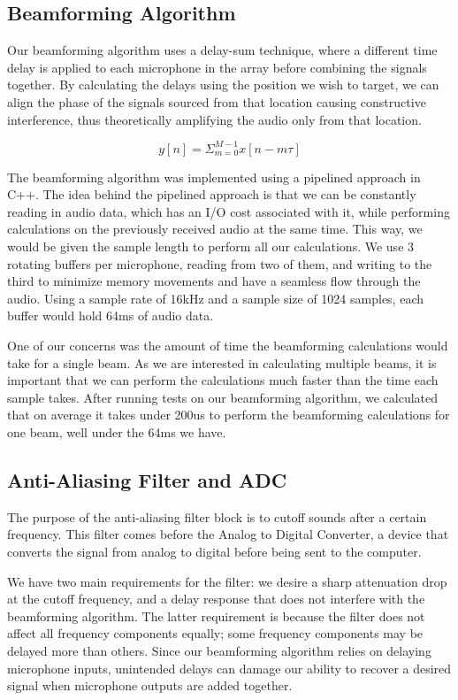 \documentclass[10pt,journal,compsoc]{IEEEtran}
\begin{document}
\subsection{Beamforming Algorithm}

Our beamforming algorithm uses a delay-sum technique, where a different time delay is applied to each microphone in the array before combining the signals together. By calculating the delays using the position we wish to target, we can align the phase of the signals sourced from that location causing constructive interference, thus theoretically amplifying the audio only from that location.

\begin{equation} \label{eq:beamforming}
y[n] = \Sigma^{M-1}_{m=0}x[n-m\tau]
\end{equation}

The beamforming algorithm was implemented using a pipelined approach in C++. The idea behind the pipelined approach is that we can be constantly reading in audio data, which has an I/O cost associated with it, while performing calculations on the previously received audio at the same time. This way, we would be given the sample length to perform all our calculations. We use 3 rotating buffers per microphone, reading from two of them, and writing to the third to minimize memory movements and have a seamless flow through the audio. Using a sample rate of 16kHz and a sample size of 1024 samples, each buffer would hold 64ms of audio data.

One of our concerns was the amount of time the beamforming calculations would take for a single beam. As we are interested in calculating multiple beams, it is important that we can perform the calculations much faster than the time each sample takes. After running tests on our beamforming algorithm, we calculated that on average it takes under 200us to perform the beamforming calculations for one beam, well under the 64ms we have.


\subsection{Anti-Aliasing Filter and ADC}
The purpose of the anti-aliasing filter block is to cutoff sounds after a certain frequency. This filter comes before the Analog to Digital Converter, a device that converts the signal from analog to digital before being sent to the computer.

We have two main requirements for the filter:  we desire a sharp attenuation drop at the cutoff frequency, and a delay response that does not interfere with the beamforming algorithm. The latter requirement is because the filter does not affect all frequency components equally; some frequency components may be delayed more than others. Since our beamforming algorithm relies on delaying microphone inputs, unintended delays can damage our ability to recover a desired signal when microphone outputs are added together.
\end{document}
